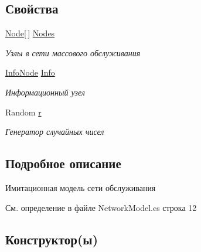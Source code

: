 \subsection*{Свойства}
\begin{DoxyCompactItemize}
\item 
\hyperlink{class_network_simulator_1_1_node}{Node}\mbox{[}$\,$\mbox{]} \hyperlink{class_network_simulator_1_1_network_model_a822a8596ab343f9a22006035fdaf4b6f}{Nodes}
\begin{DoxyCompactList}\small\item\em Узлы в сети массового обслуживания \end{DoxyCompactList}\item 
\hyperlink{class_network_simulator_1_1_info_node}{Info\+Node} \hyperlink{class_network_simulator_1_1_network_model_ad855627388c67befd2c4c736a87fa84d}{Info}
\begin{DoxyCompactList}\small\item\em Информационный узел \end{DoxyCompactList}\item 
Random \hyperlink{class_network_simulator_1_1_network_model_aaeac879328213fb50bce2e4c44368ecf}{r}
\begin{DoxyCompactList}\small\item\em Генератор случайных чисел \end{DoxyCompactList}\end{DoxyCompactItemize}


\subsection{Подробное описание}
Имитационная модель сети обслуживания 



См. определение в файле Network\+Model.\+cs строка 12



\subsection{Конструктор(ы)}
